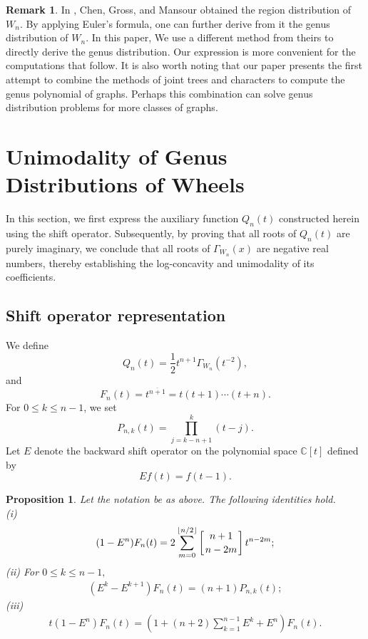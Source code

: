 \documentclass[12pt]{article}
\newtheorem{proposition}[theorem]{Proposition}
\theoremstyle{definition}
\newtheorem{remark}[theorem]{Remark}
\begin{document}
\begin{remark} In \cite{Chen2018}, Chen, Gross, and Mansour obtained the region distribution of $W_n$.
 By applying Euler's formula, one can further derive from it the genus distribution of $W_n$.
In this paper, We use a different method from theirs to directly derive the genus distribution. Our expression is more convenient for the computations that follow. It is also worth noting that
our paper presents the first attempt to combine the methods of joint trees and characters to compute the genus polynomial of graphs. Perhaps this combination can solve genus distribution problems for more classes of graphs.
\end{remark}



\section{Unimodality of Genus Distributions of Wheels}\label{Sec:3}
In this section, we first express the auxiliary function $Q_n(t)$ constructed herein using the shift operator. Subsequently, by proving that all roots of
$Q_n(t)$ are purely imaginary, we conclude that all roots of $\Gamma_{W_n}(x)$ are negative real numbers, thereby establishing the log-concavity and unimodality of its coefficients.



\subsection{Shift operator representation}
We define \[
Q_n(t)=\frac{1}{2} t^{n+1}\Gamma_{W_n}(t^{-2}),
\] and \[F_{n}(t)=t^{\overline{n+1}}=t(t+1)\cdots(t+n).\] For \(0\le k\le n-1\), we set
\[
P_{n,k}(t)=\prod_{j=k-n+1}^{k}(t-j).
\]
Let \( E \) denote the backward shift operator on the polynomial space \( \mathbb{C}[t] \) defined by
\[ Ef(t) = f(t-1). \]


\begin{proposition}\label{pro3:1}
Let the notation be as above. The following identities hold.
\\(i) \begin{eqnarray}\label{e11} (1-E^n)F_{n}(t)= 2 \sum_{m=0}^{\lfloor n/2 \rfloor} \left[ {n+1 \atop n-2m} \right]  t^{n-2m};\end{eqnarray}
(ii) For $0\leq k\leq n-1,$ \begin{eqnarray}\label{e12}(E^k-E^{k+1})F_{n}(t)=(n+1)P_{n,k}(t);\end{eqnarray}
(iii) \begin{eqnarray}\label{e13}
t(1-E^n)F_{n}(t)= \left( 1 + (n + 2) \sum_{k=1}^{n-1} E^k + E^n \right) F_n(t).\end{eqnarray}
\end{proposition}
\end{document}
